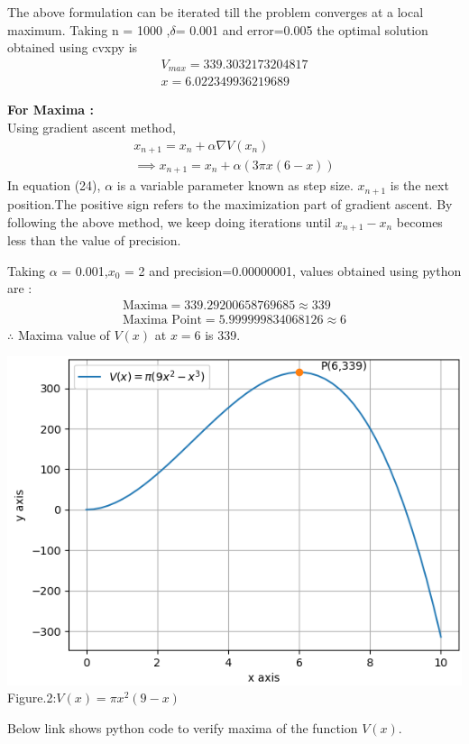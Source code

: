 \documentclass[10pt, a4paper]{article}
\begin{document}
The above formulation can be iterated till the problem converges at a local maximum. Taking n = 1000 ,$\delta$= 0.001 and error=0.005 the optimal solution obtained
using cvxpy is
\begin{align*}
	\boxed{V_{max} = 339.3032173204817}\\
	\boxed{x = 6.022349936219689}
\end{align*}

\textbf{For Maxima :}
\\Using gradient ascent method,
\begin{align}
x_{n+1} = x_n + \alpha \nabla V(x_n)\\
\implies x_{n+1} = x_n + \alpha (3\pi x(6-x))
\end{align}
In equation (24), $\alpha$ is a variable parameter known as step size. $x_{n+1}$ is the next position.The positive sign refers to the maximization part of gradient ascent. By following the above method, we keep doing iterations until $x_{n+1}-x_n$ becomes
less than the value of precision.

Taking $\alpha$ = 0.001,$x_0$ = 2 and precision=0.00000001, values obtained using python are :
\begin{align*}
        \boxed{\text{Maxima} = 339.29200658769685 \approx 339 }\\
        \boxed{\text{Maxima Point} = 5.999999834068126 \approx 6}
\end{align*}
$\therefore$ Maxima value of $V(x)$ at $x=6$ is 339.\\
\begin{center}
{\includegraphics[scale=0.5]{graph.png}}\\
Figure.2:$V(x)=\pi x^2(9-x)$
\end{center} 
Below link shows python code to verify maxima of the function $V(x)$.
\begin{center}
\end{center}
\end{document}
